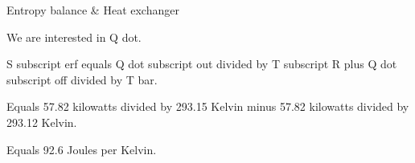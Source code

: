 Entropy balance & Heat exchanger

We are interested in Q dot.

S subscript erf equals Q dot subscript out divided by T subscript R plus Q dot subscript off divided by T bar.

Equals 57.82 kilowatts divided by 293.15 Kelvin minus 57.82 kilowatts divided by 293.12 Kelvin.

Equals 92.6 Joules per Kelvin.